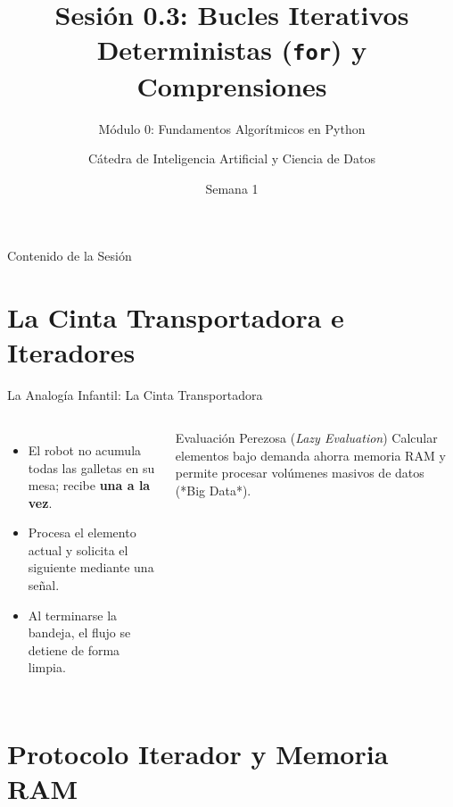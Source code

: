 \documentclass[aspectratio=169]{beamer}
\title[INT210 - Sesión 0.3]{Sesión 0.3: Bucles Iterativos Deterministas (\texttt{for}) y Comprensiones}
\subtitle{Módulo 0: Fundamentos Algorítmicos en Python}
\author[Diplomado en Ciencia de Datos]{Cátedra de Inteligencia Artificial y Ciencia de Datos}
\institute[INT210]{Machine Learning From Scratch}
\date{Semana 1}
\begin{document}
\frame{\titlepage}

\begin{frame}{Contenido de la Sesión}
    \tableofcontents
\end{frame}

\section{La Cinta Transportadora e Iteradores}

\begin{frame}{La Analogía Infantil: La Cinta Transportadora}
    \begin{columns}
        \begin{itemize}
            \item El robot no acumula todas las galletas en su mesa; recibe \textbf{una a la vez}.
            \item Procesa el elemento actual y solicita el siguiente mediante una señal.
            \item Al terminarse la bandeja, el flujo se detiene de forma limpia.
        \end{itemize}
        \begin{alertblock}{Evaluación Perezosa (\textit{Lazy Evaluation})}
            Calcular elementos bajo demanda ahorra memoria RAM y permite procesar volúmenes masivos de datos (*Big Data*).
        \end{alertblock}
    \end{columns}
\end{frame}

\section{Protocolo Iterador y Memoria RAM}
\end{document}
